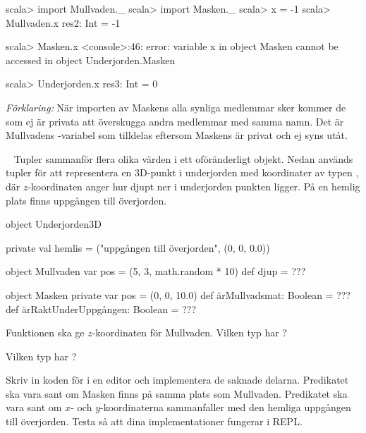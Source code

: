 \SubtaskSolved

\begin{REPL}
scala> import Mullvaden._
scala> import Masken._
scala> x = -1
scala> Mullvaden.x
res2: Int = -1

scala> Masken.x
<console>:46: error:
  variable x in object Masken cannot be accessed
  in object Underjorden.Masken

scala> Underjorden.x
res3: Int = 0
\end{REPL}

\noindent \emph{Förklaring:} När importen av Maskens alla synliga medlemmar sker kommer de som ej är privata att överskugga andra medlemmar med samma namn. Det är Mullvadens -variabel som tilldelas  eftersom Maskens  är privat och ej syns utåt.

\QUESTEND





\QUESTBEGIN

\Task \what~ Tupler sammanför flera olika värden i ett oföränderligt objekt. Nedan används tupler för att representera en 3D-punkt i underjorden med koordinater  av typen , där $z$-koordinaten anger hur djupt ner i underjorden punkten ligger. På en hemlig plats finns uppgången till överjorden.

\begin{Code}
object Underjorden3D {
  private val hemlis = ("uppgången till överjorden", (0, 0, 0.0))

  object Mullvaden {
    var pos = (5, 3, math.random * 10)
    def djup  = ???
  }

  object Masken {
    private var pos = (0, 0, 10.0)
    def ärMullvadsmat: Boolean = ???
    def ärRaktUnderUppgången: Boolean = ???
  }
}
\end{Code}

\Subtask Funktionen  ska ge $z$-koordinaten för Mullvaden. Vilken typ har ?

\Subtask Vilken typ har ?

\Subtask Skriv in koden för  i en editor och implementera de saknade delarna. Predikatet  ska vara sant om Masken finns på samma plats som Mullvaden. Predikatet   ska vara sant om $x$- och $y$-koordinaterna sammanfaller med den hemliga uppgången till överjorden. Testa så att dina implementationer fungerar i REPL.

